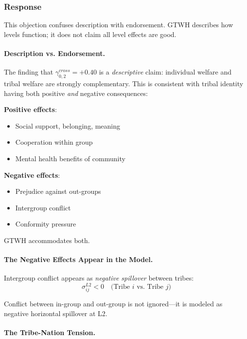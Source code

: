 \documentclass[12pt,a4paper]{article}
\begin{document}
\subsubsection{Response}

This objection confuses description with endorsement. GTWH describes how 
levels function; it does not claim all level effects are good.

\paragraph{Description vs. Endorsement.}

The finding that $\gamma^{cross}_{0,2} = +0.40$ is a \textit{descriptive} 
claim: individual welfare and tribal welfare are strongly complementary. 
This is consistent with tribal identity having both positive \textit{and} 
negative consequences:

\textbf{Positive effects}:
\begin{itemize}[nosep]
\item Social support, belonging, meaning
\item Cooperation within group
\item Mental health benefits of community
\end{itemize}

\textbf{Negative effects}:
\begin{itemize}[nosep]
\item Prejudice against out-groups
\item Intergroup conflict
\item Conformity pressure
\end{itemize}

GTWH accommodates both.

\paragraph{The Negative Effects Appear in the Model.}

Intergroup conflict appears as \textit{negative spillover} between tribes:
\begin{equation}
\sigma^{L2}_{ij} < 0 \quad \text{(Tribe } i \text{ vs. Tribe } j \text{)}
\end{equation}

Conflict between in-group and out-group is not ignored---it is modeled as 
negative horizontal spillover at L2.

\paragraph{The Tribe-Nation Tension.}
\end{document}
